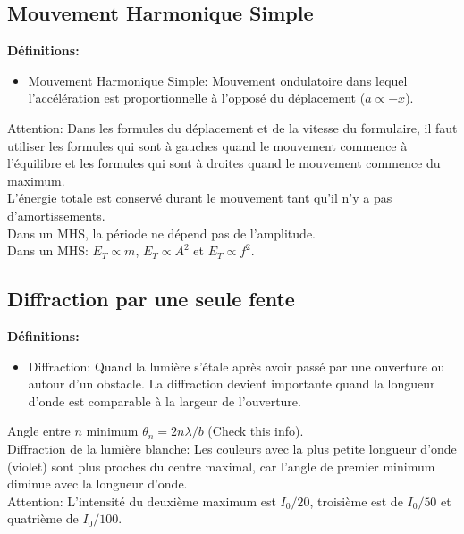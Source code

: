\documentclass[french, a4paper, 12pt]{article}
\begin{document}
\subsection{Mouvement Harmonique Simple}
\textbf{Définitions:}
\begin{itemize}
\item Mouvement Harmonique Simple: Mouvement ondulatoire dans lequel l'accélération est proportionnelle à l'opposé du déplacement ($a\propto -x$).
\end{itemize}
Attention: Dans les formules du déplacement et de la vitesse du formulaire, il faut utiliser les formules qui sont à gauches quand le mouvement commence à l'équilibre et les formules qui sont à droites quand le mouvement commence du maximum.\\
L'énergie totale est conservé durant le mouvement tant qu'il n'y a pas d'amortissements.\\
Dans un MHS, la période ne dépend pas de l'amplitude.\\
Dans un MHS: $E_T \propto m$, $E_T \propto A^2$ et $E_T \propto f^2$.

\subsection{Diffraction par une seule fente}
\textbf{Définitions:}
\begin{itemize}
\item Diffraction: Quand la lumière s'étale après avoir passé par une ouverture ou autour d'un obstacle. La diffraction devient importante quand la longueur d'onde est comparable à la largeur de l'ouverture.
\end{itemize}
Angle entre $n$ minimum $\theta _n = 2n \lambda/b$ (Check this info).\\
Diffraction de la lumière blanche: Les couleurs avec la plus petite longueur d'onde (violet) sont plus proches du centre maximal, car l'angle de premier minimum diminue avec la longueur d'onde.\\
Attention: L'intensité du deuxième maximum est $I_0/20$, troisième est de $I_0/50$ et quatrième de $I_0/100$.
\end{document}
